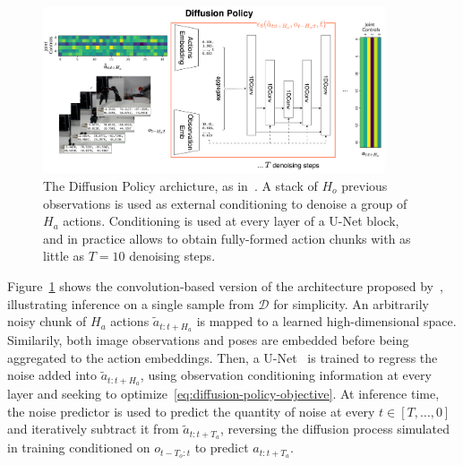 \begin{figure}
    \centering
    \includegraphics[width=0.9\textwidth]{figures/ch4/ch4-diffusion-policy.png}
    \caption{The Diffusion Policy archicture, as in~\citet{chiDiffusionPolicyVisuomotor2024}. A stack of \( H_o \) previous observations is used as external conditioning to denoise a group of \( H_a \) actions. Conditioning is used at every layer of a U-Net block, and in practice allows to obtain fully-formed action chunks with as little as \(T=10\) denoising steps.}
    \label{fig:diffusion-policy-architecture}
\end{figure}

Figure~\ref{fig:diffusion-policy-architecture} shows the convolution-based version of the architecture proposed by~\citet{chiDiffusionPolicyVisuomotor2024}, illustrating inference on a single sample from \( \mathcal D \) for simplicity.
An arbitrarily noisy chunk of \( H_a \) actions \(\tilde a_{t:t+H_a} \) is mapped to a learned high-dimensional space. 
Similarily, both image observations and poses are embedded before being aggregated to the action embeddings.
Then, a U-Net~\citep{ronnebergerUNetConvolutionalNetworks2015} is trained to regress the noise added into \( \tilde a_{t:t+H_a} \), using observation conditioning information at every layer and seeking to optimize~\ref{eq:diffusion-policy-objective}.
At inference time, the noise predictor is used to predict the quantity of noise at every \( t \in [T, \dots, 0 ] \) and iteratively subtract it from \(\tilde a_{t:t+T_a} \), reversing the diffusion process simulated in training conditioned on \(o_{t-T_o:t} \) to predict \(a_{t:t+T_a} \).

